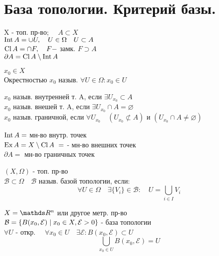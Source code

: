 \documentclass[geometry.tex]{subfiles}
\begin{document}
  \section{База топологии. Критерий базы.}

  \begin{definition}
      X - топ. пр-во; $\quad A \subset X$ \\
      $\mathop{\rm Int}\nolimits A = \cup U, \quad U \in \Omega \quad U \subset A$\\
      $\mathop{\rm Cl}\nolimits A = \cap F, \quad F - $ замк. $F \supset A$ \\
      $\partial A = \mathop{\rm Cl}\nolimits A \setminus \mathop{\rm Int}\nolimits A$
  \end{definition}

  \begin{definition}
      $x_0 \in X$\\
      Окрестностью $x_0$ назыв. $\forall U \in \Omega: x_0 \in U$
  \end{definition}

  \begin{definition}
      $x_0$ назыв. внутренней т. A, если $\exists U_{x_0} \subset A$\\
      $x_0$ назыв. внешей т. A, если $\exists U_{x_0} \cap A = \varnothing$\\
      $x_0$ назыв. граничной, если $\forall U_{x_0} \quad (U_{x_0} \not \subset A)$ и $(U_{x_0} \cap A \neq \varnothing)$
  \end{definition}

  \begin{upr}
      $\mathop{\rm Int}\nolimits A = $ мн-во внутр. точек\\
      $\mathop{\rm Ex}\nolimits A = X \setminus \mathop{\rm Cl}\nolimits A \ =$ - мн-во внешних точек\\
      $\partial A = $ мн-во граничных точек
  \end{upr}

  \begin{definition}
      $(X, \Omega)$ - топ. пр-во\\
      $\mathcal{B} \subset \Omega \quad \mathcal{B}$ назыв. базой топологии, если:\\
      \[\forall U \in \Omega \quad \exists \{V_i\} \in \mathcal{B}: \quad U = \bigcup_{i \in I} V_i\]
  \end{definition}

  \begin{example}
      $X = \R^n$ или другое метр. пр-во\\
      $\mathcal{B} = \{B(x_0, \mathcal{E}) \; | \; x_0 \in X, \mathcal{E} > 0\}$ - база топологии\\
      $\forall U$ - откр. $\quad \forall x_0 \in U \quad \exists \mathcal{E}: B(x_0, \mathcal{E}) \subset U$\\
      \[\bigcup_{x_0 \in U} B(x_0, \mathcal{E}) = U\]
  \end{example}
\end{document}
